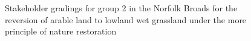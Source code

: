 \documentclass[
  12pt,
  letterpaper,
  DIV=11,
  numbers=noendperiod]{scrartcl}
\begin{document}
\begin{figure}[H]


\caption{\label{fig-BroadsArMoreG2}Stakeholder gradings for group 2 in
the Norfolk Broads for the reversion of arable land to lowland wet
grassland under the more principle of nature restoration}

\end{figure}%
\end{document}
